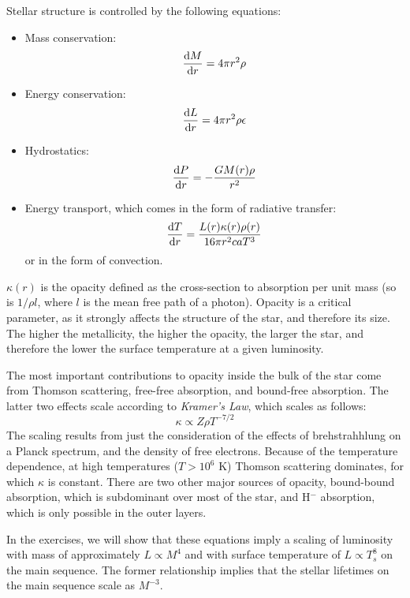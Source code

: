 Stellar structure is controlled by the following equations:
\begin{itemize}
\item Mass conservation:
\begin{equation}
\frac{{\rm d}M}{{\rm d}r} = 4 \pi r^2 \rho
\end{equation}
\item Energy conservation:
\begin{equation}
\frac{{\rm d}L}{{\rm d}r} = 4 \pi r^2 \rho \epsilon
\end{equation}
\item Hydrostatics:
\begin{equation}
\frac{{\rm d}P}{{\rm d}r} = - \frac{GM(r) \rho}{r^2}
\end{equation}
\item Energy transport, which comes in the form of radiative transfer:
\begin{equation}
\frac{{\rm d}T}{{\rm d}r} = \frac{L(r)\kappa(r) \rho(r)}{16\pi r^2 c a T^3}
\end{equation}
or in the form of convection.
\end{itemize}
$\kappa(r)$ is the opacity defined as the cross-section to absorption
per unit mass (so is $1/\rho l$, where $l$ is the mean free path of a
photon). Opacity is a critical parameter, as it strongly affects the
structure of the star, and therefore its size. The higher the
metallicity, the higher the opacity, the larger the star, and
therefore the lower the surface temperature at a given luminosity.

The most important contributions to opacity inside the bulk of the
star come from Thomson scattering, free-free absorption, and
bound-free absorption. The latter two effects scale according to {\it
Kramer's Law}, which scales as follows:
\begin{equation}
\kappa \propto Z \rho T^{-7/2}
\end{equation}
The scaling results from just the consideration of the effects of
brehstrahhlung on a Planck spectrum, and the density of free
electrons. Because of the temperature dependence, at high temperatures
($T> 10^6$ K) Thomson scattering dominates, for which $\kappa$ is
constant. There are two other major sources of opacity, bound-bound
absorption, which is subdominant over most of the star, and H$^{-}$
absorption, which is only possible in the outer layers.

In the exercises, we will show that these equations imply a scaling of
luminosity with mass of approximately $L\propto M^4$ and with surface
temperature of $L\propto T_s^8$ on the main sequence.  The former
relationship implies that the stellar lifetimes on the main sequence
scale as $M^{-3}$.

